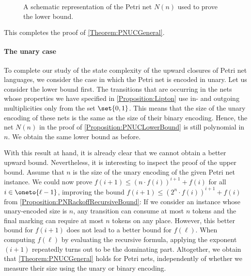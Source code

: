 \documentclass[../../diss.tex]{subfiles}
\begin{document}
\begin{figure}
    \centering%
    \caption{A schematic representation of the Petri net $N(n)$ used to prove the lower bound.}%
    \label{Figure:PNUCLowerBound}%
\end{figure}

This completes the proof of \cref{Theorem:PNUCGeneral}.

\paragraph{The unary case}

To complete our study of the state complexity of the upward closures of Petri net languages, we consider the case in which the Petri net is encoded in unary.
Let us consider the lower bound first.
The transitions that are occurring in the nets whose properties we have specified in \cref{Proposition:Lipton} use in- and outgoing multiplicities only from the set $\set{0,1}$.
This means that the size of the unary encoding of these nets is the same as the size of their binary encoding.
Hence, the net $N(n)$ in the proof of \cref{Proposition:PNUCLowerBound} is still polynomial in $n$.
We obtain the same lower bound as before.

With this result at hand, it is already clear that we cannot obtain a better upward bound.
Nevertheless, it is interesting to inspect the proof of the upper bound.
Assume that $n$ is the size of the unary encoding of the given Petri net instance.
We could now prove $f(i+1) \leq {(n \cdot f(i))}^{i+1} + f(i)$ for all $i\in \oneto{\ell-1}$, improving the bound $f(i+1) \leq {(2^n \cdot f(i))}^{i+1} + f(i)$ from \cref{Proposition:PNRackoffRecursiveBound}:
If we consider an instance whose unary-encoded size is $n$, any transition can consume at most $n$ tokens and the final marking can require at most $n$ tokens on any place.
However, this better bound for $f(i+1)$ does not lead to a better bound for $f(\ell)$.
When computing $f(\ell)$ by evaluating the recursive formula, applying the exponent $(i+1)$ repeatedly turns out to be the dominating part.
Altogether, we obtain that \cref{Theorem:PNUCGeneral} holds for Petri nets, independently of whether we measure their size using the unary or binary encoding.
\end{document}
